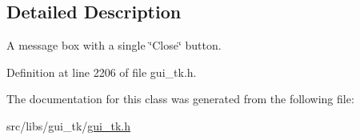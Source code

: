 \subsection{Detailed Description}
A message box with a single \char`\"{}\-Close\char`\"{} button. 

Definition at line 2206 of file gui\-\_\-tk.\-h.



The documentation for this class was generated from the following file\-:\begin{DoxyCompactItemize}
\item 
src/libs/gui\-\_\-tk/\hyperlink{gui__tk_8h}{gui\-\_\-tk.\-h}\end{DoxyCompactItemize}
